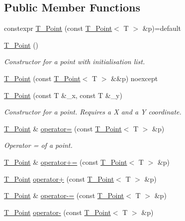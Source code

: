 \subsection*{Public Member Functions}
\begin{DoxyCompactItemize}
\item 
constexpr \hyperlink{classT__Point_af313da04154273b9a75d66e9950359ea}{T\+\_\+\+Point} (const \hyperlink{classT__Point}{T\+\_\+\+Point}$<$ T $>$ \&p)=default
\item 
\hyperlink{classT__Point_a61017b12d3c2aa88a242dbbc57733413}{T\+\_\+\+Point} ()
\begin{DoxyCompactList}\small\item\em Constructor for a point with initialisation list. \end{DoxyCompactList}\item 
\hyperlink{classT__Point_af6c471d7e5547576a6c379930b9d1d35}{T\+\_\+\+Point} (const \hyperlink{classT__Point}{T\+\_\+\+Point}$<$ T $>$ \&\&p) noexcept
\item 
\hyperlink{classT__Point_a12f2ef3c5f10e162dcb6385bbfbfae58}{T\+\_\+\+Point} (const T \&\+\_\+x, const T \&\+\_\+y)
\begin{DoxyCompactList}\small\item\em Constructor for a point. Requires a X and a Y coordinate. \end{DoxyCompactList}\item 
\hyperlink{classT__Point}{T\+\_\+\+Point} \& \hyperlink{classT__Point_a13fbb5646f2333aa41194d648423e10f}{operator=} (const \hyperlink{classT__Point}{T\+\_\+\+Point}$<$ T $>$ \&p)
\begin{DoxyCompactList}\small\item\em Operator = of a point. \end{DoxyCompactList}\item 
\hyperlink{classT__Point}{T\+\_\+\+Point} \& \hyperlink{classT__Point_a4fa7b8ceb837c81e608d5ddad0f1ffe7}{operator+=} (const \hyperlink{classT__Point}{T\+\_\+\+Point}$<$ T $>$ \&p)
\item 
\hyperlink{classT__Point}{T\+\_\+\+Point} \hyperlink{classT__Point_a1f94a7a19cc8711e7784f700ea59297a}{operator+} (const \hyperlink{classT__Point}{T\+\_\+\+Point}$<$ T $>$ \&p)
\item 
\hyperlink{classT__Point}{T\+\_\+\+Point} \& \hyperlink{classT__Point_aa438de3090999e1f24f0de58dc5171a0}{operator-\/=} (const \hyperlink{classT__Point}{T\+\_\+\+Point}$<$ T $>$ \&p)
\item 
\hyperlink{classT__Point}{T\+\_\+\+Point} \hyperlink{classT__Point_a4a3671d0a9763b3e749c799294ebb1ca}{operator-\/} (const \hyperlink{classT__Point}{T\+\_\+\+Point}$<$ T $>$ \&p)

\end{DoxyCompactItemize}
